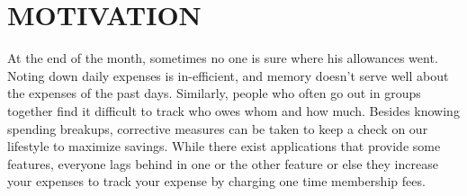 \documentclass[12pt]{article}
\begin{document}
\newpage
\section{MOTIVATION}

At the end of the month, sometimes no one is sure where his allowances went. Noting down daily expenses is in-efficient, and memory doesn't serve well about the expenses of the past days. Similarly, people who often go out in groups together find it difficult to track who owes whom and how much. Besides knowing spending breakups, corrective measures can be taken to keep a check on our lifestyle to maximize savings.
While there exist applications that provide some features, everyone lags behind in one or the other feature or else they increase your expenses to track your expense by charging one time membership fees.

\newpage
\end{document}
